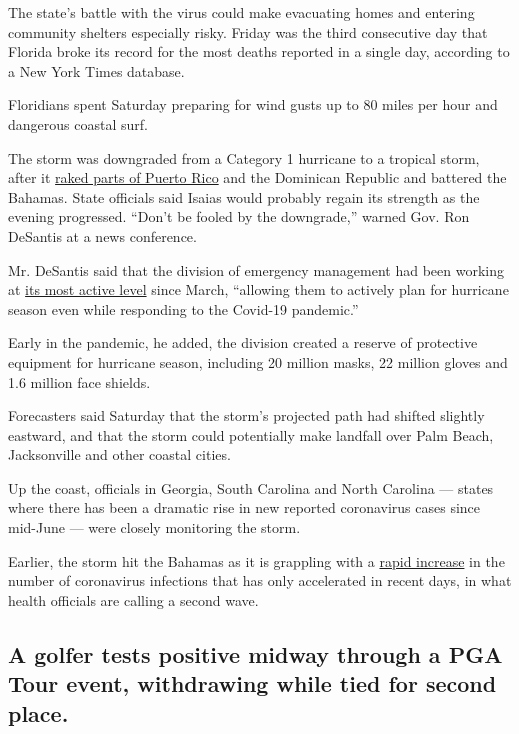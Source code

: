 The state's battle with the virus could make evacuating homes and
entering community shelters especially risky. Friday was the third
consecutive day that Florida broke its record for the most deaths
reported in a single day, according to a New York Times database.

Floridians spent Saturday preparing for wind gusts up to 80 miles per
hour and dangerous coastal surf.

The storm was downgraded from a Category 1 hurricane to a tropical
storm, after it
\href{https://www.nytimes3xbfgragh.onion/2020/07/31/us/hurricane-isaias.html}{raked
parts of Puerto Rico} and the Dominican Republic and battered the
Bahamas. State officials said Isaias would probably regain its strength
as the evening progressed. ``Don't be fooled by the downgrade,'' warned
Gov. Ron DeSantis at a news conference.

Mr. DeSantis said that the division of emergency management had been
working at
\href{https://www.floridadisaster.org/sert/eoc-activation-levels/}{its
most active level} since March, ``allowing them to actively plan for
hurricane season even while responding to the Covid-19 pandemic.''

Early in the pandemic, he added, the division created a reserve of
protective equipment for hurricane season, including 20 million masks,
22 million gloves and 1.6 million face shields.

Forecasters said Saturday that the storm's projected path had shifted
slightly eastward, and that the storm could potentially make landfall
over Palm Beach, Jacksonville and other coastal cities.

Up the coast, officials in Georgia, South Carolina and North Carolina
--- states where there has been a dramatic rise in new reported
coronavirus cases since mid-June --- were closely monitoring the storm.

Earlier, the storm hit the Bahamas as it is grappling with a
\href{https://www.nytimes3xbfgragh.onion/2020/07/04/world/americas/virus-caribbean-hurricane.html}{rapid
increase} in the number of coronavirus infections that has only
accelerated in recent days, in what health officials are calling a
second wave.

\hypertarget{a-golfer-tests-positive-midway-through-a-pga-tour-event-withdrawing-while-tied-for-second-place}{%
\subsection{A golfer tests positive midway through a PGA Tour event,
withdrawing while tied for second
place.}\label{a-golfer-tests-positive-midway-through-a-pga-tour-event-withdrawing-while-tied-for-second-place}}

